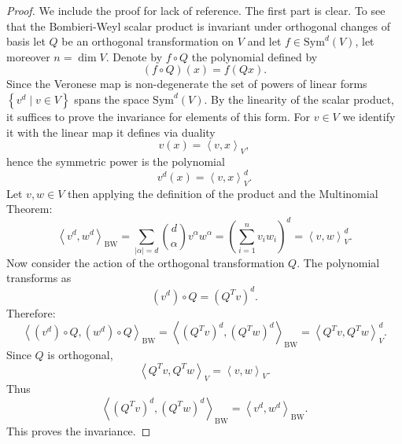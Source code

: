 \documentclass[10pt,a4paper]{amsart}
\begin{document}
\begin{proof}
We include the proof for lack of reference. The first part is clear. To see that the Bombieri-Weyl scalar product
is invariant under orthogonal changes of basis let $Q$ be an
orthogonal transformation on $V$ and let
$f\in\mathrm{Sym}^{d}\left( V \right)$,
let moreover $n=\dim V$. Denote by $f\circ Q$ the polynomial defined
by
\[
\left( f\circ Q \right)\left( x \right)
=
f\left( Qx \right).
\]
Since the Veronese map is non-degenerate the set of powers of linear
forms $\left\{ v^{d}\mid v\in V \right\}$ spans the space
$\mathrm{Sym}^{d}\left( V \right)$. By the linearity of the scalar
product, it suffices to prove the invariance for elements of this
form. For $v\in V$ we identify it with the linear map it defines via
duality
\[
v\left( x \right)
=
\left\langle v,x \right\rangle_{V},
\]
hence the symmetric power is the polynomial
\[
v^{d}\left( x \right)
=
\left\langle v,x \right\rangle_{V}^{d}.
\]
Let $v,w\in V$ then applying the definition of the product and the
Multinomial Theorem:
\begin{equation}
\left\langle v^{d},w^{d} \right\rangle_{\mathrm{BW}}
=
\sum_{\left| \alpha \right|=d}
\binom{d}{\alpha}
v^{\alpha} w^{\alpha}
=
\left( \sum_{i=1}^{n} v_{i} w_{i} \right)^{d}
=
\left\langle v,w \right\rangle_{V}^{d}.
\label{eq:CompatibilityBWInnerProduct}
\end{equation}
Now consider the action of the orthogonal transformation $Q$. The
polynomial transforms as
\[
\left( v^{d} \right)\circ Q
=
\left( Q^{T}v \right)^{d}.
\]
Therefore:
\[
\left\langle
\left( v^{d} \right)\circ Q,
\left( w^{d} \right)\circ Q
\right\rangle_{\mathrm{BW}}
=
\left\langle
\left( Q^{T}v \right)^{d},
\left( Q^{T}w \right)^{d}
\right\rangle_{\mathrm{BW}}
=
\left\langle Q^{T}v,Q^{T}w \right\rangle_{V}^{d}.
\]
Since $Q$ is orthogonal,
\[
\left\langle Q^{T}v,Q^{T}w \right\rangle_{V}
=
\left\langle v,w \right\rangle_{V}.
\]
Thus
\[
\left\langle
\left( Q^{T}v \right)^{d},
\left( Q^{T}w \right)^{d}
\right\rangle_{\mathrm{BW}}
=
\left\langle v^{d},w^{d} \right\rangle_{\mathrm{BW}}.
\]
This proves the invariance.
\end{proof}
\end{document}
